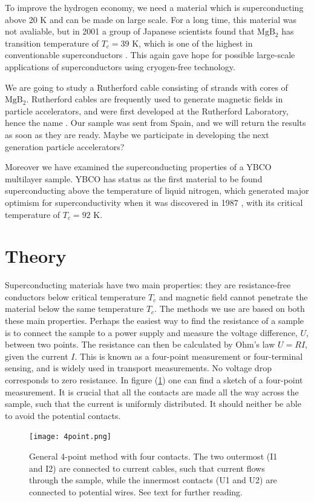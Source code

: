 \documentclass{comjnl}
\newcommand*\chem[1]{\ensuremath{\mathrm{#1}}}
\begin{document}
To improve the hydrogen economy, we need a material which is superconducting above 20 K and can be made on large scale. For a long time, this material was not avaliable, but in 2001 a group of Japanese scientists found that \chem{MgB_2} has transition temperature of $T_c=39$ K, which is one of the highest in conventionable superconductors \cite {jsap}\cite {nature}. This again gave hope for possible large-scale applications of superconductors using cryogen-free technology. 

We are going to study a Rutherford cable consisting of strands with cores of \chem{MgB_2}. Rutherford cables are frequently used to generate magnetic fields in particle accelerators, and were first developed at the Rutherford Laboratory, hence the name \cite {fnal}. Our sample was sent from Spain, and we will return the results as soon as they are ready. Maybe we participate in developing the next generation particle accelerators?

Moreover we have examined the superconducting properties of a YBCO multilayer sample. YBCO has status as the first material to be found superconducting above the temperature of liquid nitrogen, which generated major optimism for superconductivity when it was discovered in 1987 \cite{harvard}, with its critical temperature of $T_c=92$ K. 

\section{Theory}\label{Sec:Theory}
Superconducting materials have two main properties: they are resistance-free conductors below critical temperature $T_c$ and magnetic field cannot penetrate the material below the same temperature $T_c$. The methods we use are based on both these main properties. Perhaps the easiest way to find the resistance of a sample is to connect the sample to a power supply and measure the voltage difference, $U$, between two points. The resistance can then be calculated by Ohm's law $U=RI$, given the current $I$. This is known as a four-point measurement or four-terminal sensing, and is widely used in transport measurements. No voltage drop corresponds to zero resistance. In figure (\ref{fig:4point}) one can find a sketch of a four-point measurement. It is crucial that all the contacts are made all the way across the sample, such that the current is uniformly distributed. It should neither be able to avoid the potential contacts.
\begin{figure}[h]
\centering
\texttt{[image: 4point.png]}
\caption{General 4-point method with four contacts. The two outermost (I1 and I2) are connected to current cables, such that current flows through the sample, while the innermost contacts (U1 and U2) are connected to potential wires. See text for further reading. \label{fig:4point}}
\end{figure}
\end{document}
